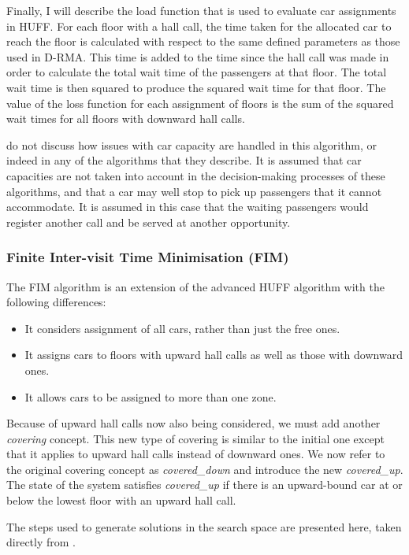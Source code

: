 \documentclass{UoYCSproject}
\begin{document}
Finally, I will describe the load function that is used to evaluate car assignments in HUFF.  For each floor with a hall call, the time taken for the allocated car to reach the floor is calculated with respect to the same defined parameters as those used in D-RMA.  This time is added to the time since the hall call was made in order to calculate the total wait time of the passengers at that floor.  The total wait time is then squared to produce the squared wait time for that floor.  The value of the loss function for each assignment of floors is the sum of the squared wait times for all floors with downward hall calls.

\citet{Bao1994} do not discuss how issues with car capacity are handled in this algorithm, or indeed in any of the algorithms that they describe.  It is assumed that car capacities are not taken into account in the decision-making processes of these algorithms, and that a car may well stop to pick up passengers that it cannot accommodate.  It is assumed in this case that the waiting passengers would register another call and be served at another opportunity.

\subsubsection{Finite Inter-visit Time Minimisation (FIM) \citep{Bao1994}}

The FIM algorithm is an extension of the advanced HUFF algorithm with the following differences:
\begin{itemize}
	\item It considers assignment of all cars, rather than just the free ones.
	\item It assigns cars to floors with upward hall calls as well as those with downward ones.
	\item It allows cars to be assigned to more than one zone.
\end{itemize}

Because of upward hall calls now also being considered, we must add another \textit{covering} concept.  This new type of covering is similar to the initial one except that it applies to upward hall calls instead of downward ones.  We now refer to the original covering concept as \textit{covered\_down} and introduce the new \textit{covered\_up}.  The state of the system satisfies \textit{covered\_up} if there is an upward-bound car at or below the lowest floor with an upward hall call.

The steps used to generate solutions in the search space are presented here, taken directly from \citet{Bao1994}.
\end{document}
